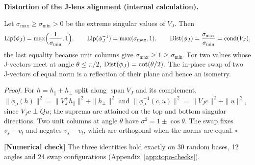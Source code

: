 \documentclass[11pt,a4paper]{article}
\newcommand{\evl}[2]{{\small\bfseries\color{#1}[#2]}}
\newcommand{\LNum}{\evl{cnum}{Numerical check}}
\newenvironment{keybox}[1]{%
  \def\FrameCommand{{\color{ccalc}\vrule width 1.6pt}\hspace{8pt}}%
  \MakeFramed{\advance\hsize-\width\FrameRestore}%
  \noindent\textbf{#1}\par\smallskip\noindent\ignorespaces}{\endMakeFramed}
\begin{document}
\begin{keybox}{Distortion of the J-lens alignment (internal calculation).}
Let $\sigma_{\max}\ge\sigma_{\min}>0$ be the extreme singular values of
$V_J$. Then
\begin{equation}
\operatorname{Lip}(\phi_J)=\max\Bigl(\frac1{\sigma_{\min}},1\Bigr),\qquad
\operatorname{Lip}(\phi_J^{-1})=\max(\sigma_{\max},1),\qquad
\operatorname{Dist}(\phi_J)=\frac{\sigma_{\max}}{\sigma_{\min}}=\operatorname{cond}(V_J),
\label{eq:topo-jlens-dist}
\end{equation}
the last equality because unit columns give $\sigma_{\max}\ge1\ge\sigma_{\min}$.
For two values whose J-vectors meet at angle $\theta\le\pi/2$,
$\operatorname{Dist}(\phi_J)=\cot(\theta/2)$. The in-place swap of two J-vectors of equal
norm is a reflection of their plane and hence an isometry.
\end{keybox}

\noindent\emph{Proof.} For $h=h_\parallel+h_\perp$ split along
$\operatorname{span}V_J$ and its complement,
$\|\phi_J(h)\|^2=\|V_J^+h_\parallel\|^2+\|h_\perp\|^2$ and
$\|\phi_J^{-1}(c,u)\|^2=\|V_Jc\|^2+\|u\|^2$, since $V_Jc\perp Qu$; the
suprema are attained on the top and bottom singular directions. Two unit
columns at angle $\theta$ have $\sigma^2=1\pm\cos\theta$. The swap fixes
$v_s+v_t$ and negates $v_s-v_t$, which are orthogonal when the norms are
equal. $\square$

\LNum{} The three identities hold exactly on 30 random bases, 12 angles
and 24 swap configurations (Appendix~\ref{app:topo-checks}).
\end{document}
